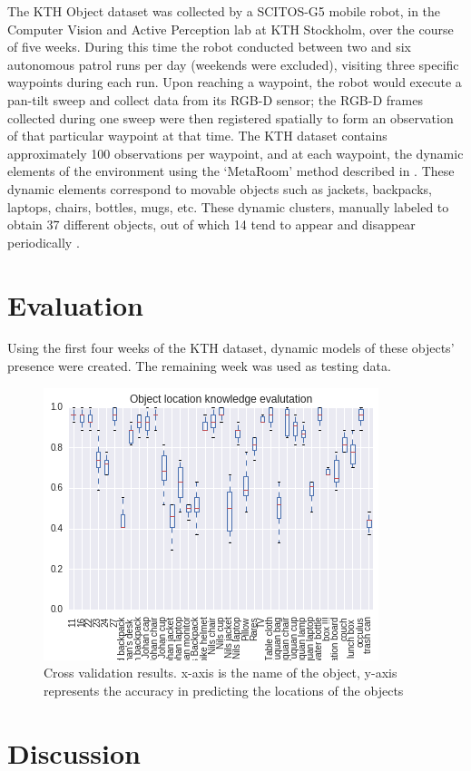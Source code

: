 The KTH Object dataset was collected by a SCITOS-G5 mobile robot, in the Computer Vision and Active Perception lab at KTH Stockholm, over  the  course  of  five  weeks.  During  this  time  the  robot conducted  between  two  and  six  autonomous  patrol  runs per  day  (weekends  were  excluded),  visiting  three  specific waypoints  during  each  run.  Upon  reaching  a  waypoint,  the robot  would  execute  a  pan-tilt  sweep  and  collect  data  from its RGB-D sensor; the RGB-D frames collected during one sweep were then registered spatially to form an observation of  that  particular  waypoint  at  that  time.  The  KTH  dataset contains  approximately  100 observations  per  waypoint,  and at  each  waypoint, the  dynamic  elements  of the  environment  using  the  ‘MetaRoom’  method  described in \cite{ambrucs2014meta}. These  dynamic  elements  correspond  to  movable  objects such  as  jackets,  backpacks,  laptops,  chairs,  bottles,  mugs, etc. These dynamic clusters,  manually labeled  to obtain 37 different objects, out  of  which  14  tend  to  appear  and  disappear  periodically \cite{krajnik_wheres_2015}. 

\section{Evaluation}

Using the first four weeks of the KTH dataset, dynamic models  of  these  objects’ presence  were  created.  The  remaining week was used as testing data.

\begin{figure}[htp]
\centering
\includegraphics[width=\textwidth]{images/learning_evaluation.png}
\caption[Cross validation results]{Cross validation results. x-axis is the name of the object, y-axis represents the accuracy in predicting the locations of the objects }
\label{object_evaluation}
\end{figure}

\section{Discussion}